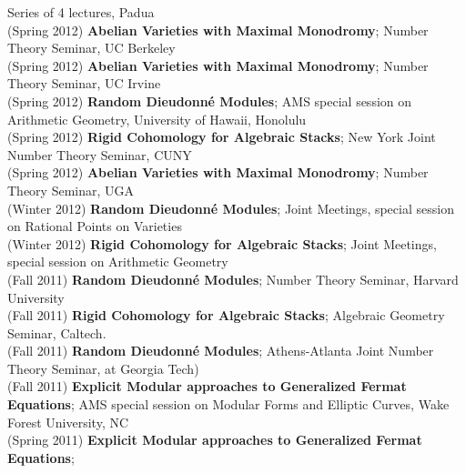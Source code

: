 \documentclass[margin,line]{res}
\begin{document}
\begin{resume}
Series of 4 lectures, Padua
\vspace{.05cm}\\
(Spring 2012) \textbf{Abelian Varieties with Maximal Monodromy};
Number Theory Seminar, UC Berkeley
\vspace{.05cm}\\
(Spring 2012) \textbf{Abelian Varieties with Maximal Monodromy};
Number Theory Seminar, UC Irvine
\vspace{.05cm}\\
(Spring 2012) \textbf{Random Dieudonn\'e Modules};
AMS special session on Arithmetic Geometry, University of Hawaii, Honolulu 
\vspace{.05cm}\\
(Spring 2012) \textbf{Rigid Cohomology for Algebraic Stacks};
New York Joint Number Theory Seminar, CUNY
\vspace{.05cm}\\
(Spring 2012) \textbf{Abelian Varieties with Maximal Monodromy};
Number Theory Seminar, UGA
\vspace{.05cm}\\
(Winter 2012) \textbf{Random Dieudonn\'e Modules};
Joint Meetings, special session on Rational Points on Varieties
\vspace{.05cm}\\
(Winter 2012) \textbf{Rigid Cohomology for Algebraic Stacks};
Joint Meetings, special session on Arithmetic Geometry
\vspace{.05cm}\\
(Fall 2011) \textbf{Random Dieudonn\'e Modules};
Number Theory Seminar, Harvard University
\vspace{.05cm}\\
(Fall 2011) \textbf{Rigid Cohomology for Algebraic Stacks};
Algebraic Geometry Seminar, Caltech.
\vspace{.05cm}\\
(Fall 2011) \textbf{Random Dieudonn\'e Modules};
Athens-Atlanta Joint Number Theory Seminar, at Georgia Tech)
\vspace{.05cm}\\
(Fall 2011) \textbf{Explicit Modular approaches to Generalized Fermat Equations};
AMS special session on Modular Forms and Elliptic Curves, Wake Forest University, NC
\vspace{.05cm}\\
(Spring 2011) \textbf{Explicit Modular approaches to Generalized Fermat Equations};

\end{resume}
\end{document}
